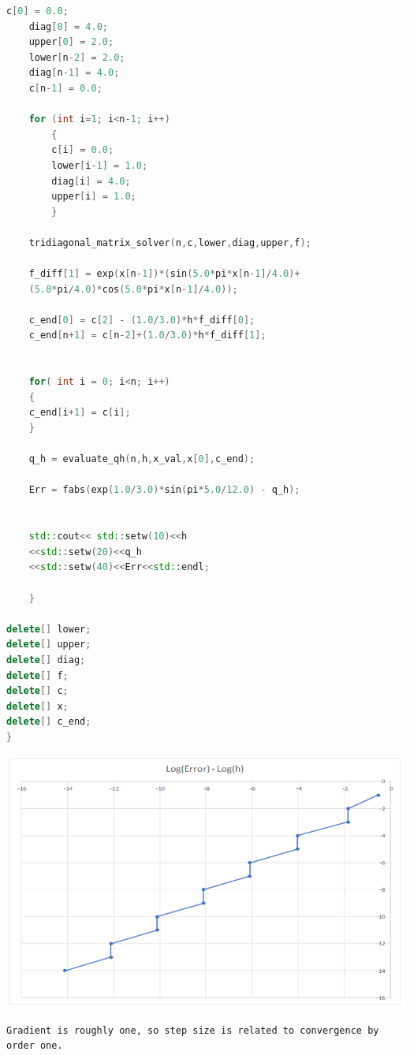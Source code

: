 \documentclass[a4paper,12pt,onecolumn,final]{article}
\begin{document}
\begin{lstlisting}[language=C++]
    c[0] = 0.0;
    diag[0] = 4.0;
    upper[0] = 2.0;
    lower[n-2] = 2.0;
    diag[n-1] = 4.0;
    c[n-1] = 0.0;

    for (int i=1; i<n-1; i++)
        {
        c[i] = 0.0;
        lower[i-1] = 1.0;
        diag[i] = 4.0;
        upper[i] = 1.0;
        }

    tridiagonal_matrix_solver(n,c,lower,diag,upper,f);

    f_diff[1] = exp(x[n-1])*(sin(5.0*pi*x[n-1]/4.0)+
    (5.0*pi/4.0)*cos(5.0*pi*x[n-1]/4.0));

    c_end[0] = c[2] - (1.0/3.0)*h*f_diff[0];
    c_end[n+1] = c[n-2]+(1.0/3.0)*h*f_diff[1];


    for( int i = 0; i<n; i++)
    {
    c_end[i+1] = c[i];
    }

    q_h = evaluate_qh(n,h,x_val,x[0],c_end);

    Err = fabs(exp(1.0/3.0)*sin(pi*5.0/12.0) - q_h);


    std::cout<< std::setw(10)<<h
    <<std::setw(20)<<q_h
    <<std::setw(40)<<Err<<std::endl;

    }

delete[] lower;
delete[] upper;
delete[] diag;
delete[] f;
delete[] c;
delete[] x;
delete[] c_end;
}


\end{lstlisting}%

\includegraphics[scale=1]{CW1bGRAPH.png} 

\begin{verbatim}
Gradient is roughly one, so step size is related to convergence by order one.
\end{verbatim}

\end{document}
